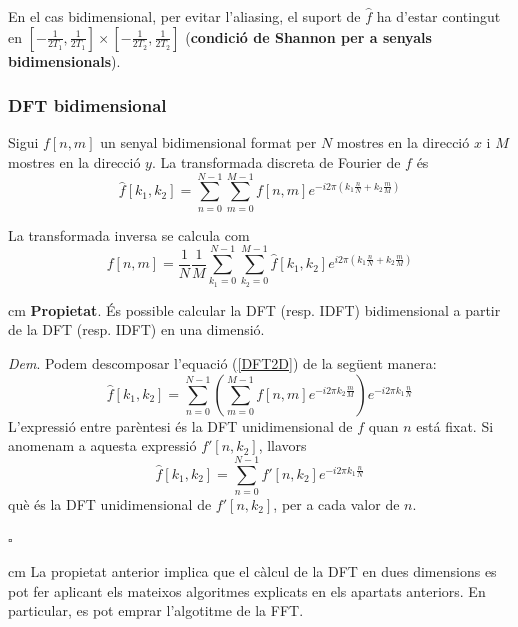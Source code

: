 \documentclass{article}
\begin{document}
En el cas bidimensional, per evitar l'aliasing, el suport de $\hat{f}$ ha d'estar
contingut en $[-\frac{1}{2T_1}, \frac{1}{2T_1}] \times [-\frac{1}{2T_2}, \frac{1}{2T_2}]$
({\bf condici\'o de Shannon per a senyals bidimensionals}).

\subsubsection{DFT bidimensional}
Sigui $f[n,m]$ un senyal bidimensional format per $N$ mostres en la direcci\'o $x$ i 
$M$ mostres en la direcci\'o $y$. La transformada discreta de Fourier de $f$ \'es
\begin{equation}
\label{DFT2D}
\hat{f}[k_1, k_2]=\sum_{n=0}^{N-1} \sum_{m=0}^{M-1} f[n,m] 
e^{-i 2 \pi (k_1 \frac{n}{N} + k_2 \frac{m}{M})}
\end{equation}

La transformada inversa se calcula com
\begin{equation}
f[n,m]=\frac{1}{N}\frac{1}{M} \sum_{k_1=0}^{N-1} \sum_{k_2=0}^{M-1} \hat{f}[k_1,k_2] 
e^{i 2 \pi (k_1 \frac{n}{N} + k_2 \frac{m}{M})}
\end{equation}

 cm
\noindent
{\bf Propietat}. \'Es possible calcular la DFT (resp. IDFT) bidimensional  
a partir de la DFT (resp. IDFT) en una dimensi\'o.

\noindent
{\it Dem}. Podem descomposar l'equaci\'o (\ref{DFT2D}) de la seg\"uent
manera:
\[
\hat{f}[k_1,k_2]=\sum_{n=0}^{N-1} \left( \sum_{m=0}^{M-1} f[n,m]
e^{-i 2 \pi k_2 \frac{m}{M}} \right) e^{-i 2 \pi k_1 \frac{n}{N}}
\]
L'expressi\'o entre par\`entesi \'es la DFT unidimensional de $f$ quan $n$
est\'a fixat. Si anomenam a aquesta expressi\'o $f'[n,k_2]$, llavors
\[
\hat{f}[k_1,k_2]= \sum_{n=0}^{N-1} f'[n,k_2] e^{-i 2 \pi k_1 \frac{n}{N}}
\]
\noindent
qu\`e \'es la DFT unidimensional de $f'[n,k_2]$, per a cada valor de $n$.
\begin{flushright}
$\square$
\end{flushright}

 cm
La propietat anterior implica que el c\`alcul de la DFT en dues dimensions es
pot fer aplicant els mateixos algoritmes explicats en els apartats anteriors.
En particular, es pot emprar l'algotitme de la FFT.






 
\end{document}
